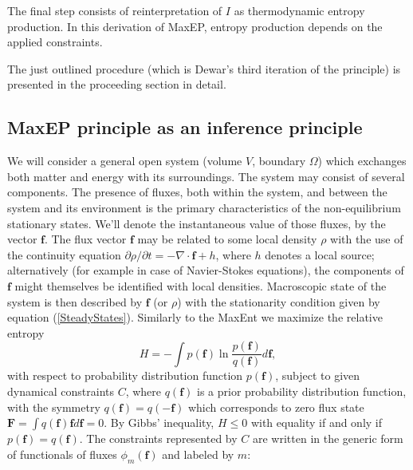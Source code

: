 \documentclass[a4paper,12pt]{article}
\begin{document}
The final step consists of reinterpretation of $I$ as thermodynamic entropy production. In this derivation of MaxEP, entropy production depends on the applied constraints.

The just outlined procedure (which is Dewar's third iteration of the principle) is presented in the proceeding section in detail.

\subsection{MaxEP principle as an inference principle}
\label{MaxEPInferenceSection}
We will consider a general open system (volume $V$, boundary $\Omega$) which exchanges both matter and energy with its surroundings. The system may consist of several components.
The presence of fluxes, both within the system, and between the system and its environment is the primary characteristics of the non-equilibrium stationary states. We'll denote the instantaneous value of those fluxes, by the vector $\bm{f}$. The flux vector $\bm{f}$ may be related to some local density $\rho$ with the use of the continuity equation $\partial \rho / \partial t =  - \nabla \cdot \bm{f} + h$, where $h$ denotes a local source; alternatively (for example in case of Navier-Stokes equations), the components of $\bm{f}$ might themselves be identified with local densities. Macroscopic state of the system is then described by $\bm{f}$ (or $\rho$) with the stationarity condition given by equation (\ref{SteadyStates}).
Similarly to the MaxEnt we maximize the relative entropy
\begin{equation}
  H = - \int p(\bm{f})\ln \frac{p(\bm{f})}{q(\bm{f})} d\bm{f},
\end{equation}
with respect to probability distribution function $p(\bm{f})$, subject to given dynamical constraints $C$, where $q(\bm{f})$ is a prior probability distribution function, with the symmetry $q(\bm{f}) =q(\bm{-f})$ which corresponds to zero flux state $\bm{F}= \int q(\bm{f}) \bm{f} d\bm{f}=0 $.
By Gibbs' inequality, $H \leq 0$ with equality if and only if $p(\bm{f})=q(\bm{f})$.
The constraints represented by $C$ are written in the generic form of functionals of fluxes $\phi_m(\bm{f})$ and labeled by $m$:
\end{document}
